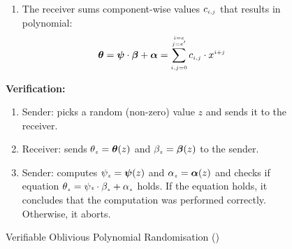 \begin{figure}[!ht]
\begin{center}
\begin{tcolorbox}[enhanced,width=4.75in,height=109mm,right=.5mm,
    drop fuzzy shadow southwest,
    colframe=black,colback=white]
\begin{enumerate}[leftmargin=-.01mm]
{\begin{enumerate}
 \item The receiver sums component-wise values $c_{\scriptscriptstyle i,j}$  that results in polynomial:
 \vspace{-3mm}
  $$\bm\theta=\bm\psi\cdot \bm\beta+\bm\alpha=\sum\limits^{\substack{\scriptscriptstyle i=e\\ \scriptscriptstyle j=e'}}_{\scriptscriptstyle i,j=0}c_{\scriptscriptstyle i, j}\cdot x^{\scriptscriptstyle i+j}$$ 
  \vspace{-3mm}
 




\end{enumerate}
\vspace{-1.8mm}
\item \label{Verification} \textbf{Verification:}
\begin{enumerate}%

\item \label{picking-random-x}Sender: picks a random (non-zero) value  $z$ and sends it to the receiver. 

\item\label{receiver-OLE-invocation} Receiver: sends $\theta_{\scriptscriptstyle z}=\bm\theta(z)$ and $\beta_{\scriptscriptstyle z}=\bm\beta(z)$ to the sender.

\item\label{receiver-OLE-invocation} Sender:  computes $\psi_{\scriptscriptstyle z}=\bm\psi(z)$ and $\alpha_{\scriptscriptstyle z}=\bm\alpha(z)$ and checks   if equation  $\theta_{\scriptscriptstyle z}=\psi{\scriptscriptstyle z}\cdot \beta_{\scriptscriptstyle z}+\alpha_{\scriptscriptstyle z}$ holds. If the equation holds, it concludes that the computation was performed correctly. Otherwise, it aborts. 
%
\end{enumerate}
}
 \end{enumerate}
 \end{tcolorbox}
\end{center}
\vspace{-6.4mm}
\caption{Verifiable Oblivious Polynomial Randomisation (\vopr)} 
\label{fig:VOPR}
\vspace{-6.5mm}
\end{figure}

